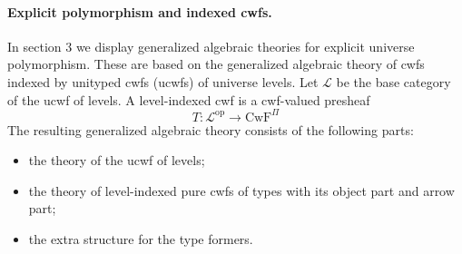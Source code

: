 \documentclass[11pt,a4paper]{article}
\theoremstyle{definition}
\newcommand{\op}{\mathrm{op}}
\def\L{{\mathcal{L}}}
\def\CwF{\mathrm{CwF}}
\begin{document}
\paragraph{Explicit polymorphism and indexed cwfs.} In section 3 we display generalized algebraic theories for explicit universe polymorphism. These are based on the generalized algebraic theory of cwfs indexed by unityped cwfs (ucwfs) of universe levels. Let $\L$ be the base category of the ucwf of levels. A level-indexed cwf is a cwf-valued presheaf 
$$
T : \L^\op \to \CwF^\Pi
$$
The resulting generalized algebraic theory consists of the following parts: \begin{itemize}
\item the theory of the ucwf of levels;
\item the theory of level-indexed pure cwfs of types with its object part and
arrow part;
\item the extra structure for the type formers.
\end{itemize}
\end{document}
